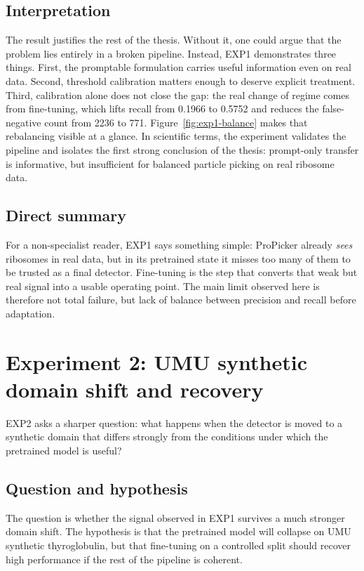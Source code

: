 \documentclass[12pt,a4paper]{report}
\begin{document}
\subsection{Interpretation}
The result justifies the rest of the thesis. Without it, one could argue that the problem lies entirely in a broken pipeline. Instead, EXP1 demonstrates three things. First, the promptable formulation carries useful information even on real data. Second, threshold calibration matters enough to deserve explicit treatment. Third, calibration alone does not close the gap: the real change of regime comes from fine-tuning, which lifts recall from 0.1966 to 0.5752 and reduces the false-negative count from 2236 to 771. Figure~\ref{fig:exp1-balance} makes that rebalancing visible at a glance. In scientific terms, the experiment validates the pipeline and isolates the first strong conclusion of the thesis: prompt-only transfer is informative, but insufficient for balanced particle picking on real ribosome data.

\subsection{Direct summary}
For a non-specialist reader, EXP1 says something simple: ProPicker already \emph{sees} ribosomes in real data, but in its pretrained state it misses too many of them to be trusted as a final detector. Fine-tuning is the step that converts that weak but real signal into a usable operating point. The main limit observed here is therefore not total failure, but lack of balance between precision and recall before adaptation.

\section{Experiment 2: UMU synthetic domain shift and recovery}
EXP2 asks a sharper question: what happens when the detector is moved to a synthetic domain that differs strongly from the conditions under which the pretrained model is useful?

\subsection{Question and hypothesis}
The question is whether the signal observed in EXP1 survives a much stronger domain shift. The hypothesis is that the pretrained model will collapse on UMU synthetic thyroglobulin, but that fine-tuning on a controlled split should recover high performance if the rest of the pipeline is coherent.
\end{document}
